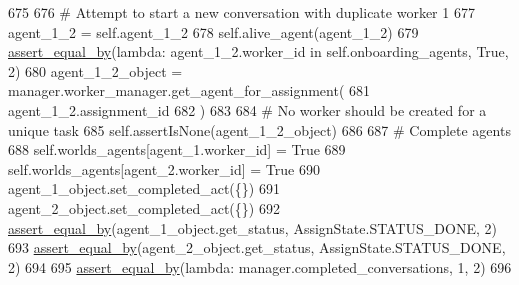 \begin{DoxyCode}
675 
676         \textcolor{comment}{# Attempt to start a new conversation with duplicate worker 1}
677         agent\_1\_2 = self.agent\_1\_2
678         self.alive\_agent(agent\_1\_2)
679         \hyperlink{namespaceparlai_1_1mturk_1_1core_1_1test_1_1test__full__system_a0b463246d35658a2e422010f13dcf819}{assert\_equal\_by}(\textcolor{keyword}{lambda}: agent\_1\_2.worker\_id \textcolor{keywordflow}{in} self.onboarding\_agents, \textcolor{keyword}{True}, 2)
680         agent\_1\_2\_object = manager.worker\_manager.get\_agent\_for\_assignment(
681             agent\_1\_2.assignment\_id
682         )
683 
684         \textcolor{comment}{# No worker should be created for a unique task}
685         self.assertIsNone(agent\_1\_2\_object)
686 
687         \textcolor{comment}{# Complete agents}
688         self.worlds\_agents[agent\_1.worker\_id] = \textcolor{keyword}{True}
689         self.worlds\_agents[agent\_2.worker\_id] = \textcolor{keyword}{True}
690         agent\_1\_object.set\_completed\_act(\{\})
691         agent\_2\_object.set\_completed\_act(\{\})
692         \hyperlink{namespaceparlai_1_1mturk_1_1core_1_1test_1_1test__full__system_a0b463246d35658a2e422010f13dcf819}{assert\_equal\_by}(agent\_1\_object.get\_status, AssignState.STATUS\_DONE, 2)
693         \hyperlink{namespaceparlai_1_1mturk_1_1core_1_1test_1_1test__full__system_a0b463246d35658a2e422010f13dcf819}{assert\_equal\_by}(agent\_2\_object.get\_status, AssignState.STATUS\_DONE, 2)
694 
695         \hyperlink{namespaceparlai_1_1mturk_1_1core_1_1test_1_1test__full__system_a0b463246d35658a2e422010f13dcf819}{assert\_equal\_by}(\textcolor{keyword}{lambda}: manager.completed\_conversations, 1, 2)
696 
\end{DoxyCode}
\mbox{\label{classparlai_1_1mturk_1_1core_1_1dev_1_1test_1_1test__full__system_1_1TestMTurkManagerWorkflows_ae7c5a42a3742d9ed616af725f87192bf}} 
